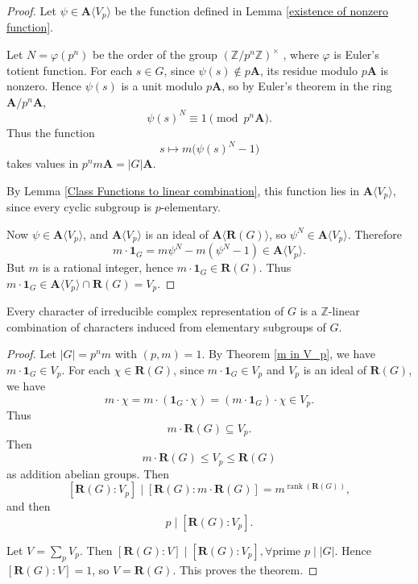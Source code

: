 \begin{proof}
Let \(\psi \in \mathbf{A}\langle V_p \rangle\) be the function defined in Lemma \ref{existence of nonzero function}.

Let \(N = \varphi(p^n)\) be the order of the group \((\mathbb{Z}/p^n\mathbb{Z})^\times\) , where $\varphi$ is Euler's totient function. For each \(s \in G\), since \(\psi(s) \notin p\mathbf{A}\), its residue modulo \(p\mathbf{A}\) is nonzero. Hence \(\psi(s)\) is a unit modulo \(p\mathbf{A}\), so by Euler's theorem in the ring \(\mathbf{A}/p^n\mathbf{A}\),
\[
\psi(s)^N \equiv 1 \pmod{p^n \mathbf{A}}.
\]
Thus the function
\[
s \mapsto m \big( \psi(s)^N - 1 \big)
\]
takes values in \(p^n m \mathbf{A} = |G| \mathbf{A}\).

By Lemma \ref{Class Functions to linear combination}, this function lies in \(\mathbf{A}\langle V_p \rangle\), since every cyclic subgroup is \(p\)-elementary.

Now \(\psi \in \mathbf{A}\langle V_p \rangle\), and \(\mathbf{A}\langle V_p \rangle\) is an ideal of \(\mathbf{A}\langle \mathbf{R}(G) \rangle\), so \(\psi^N \in \mathbf{A}\langle V_p \rangle\). Therefore
\[
m \cdot\mathbf1_G= m\psi^N - m(\psi^N - 1) \in \mathbf{A}\langle V_p \rangle.
\]
But \(m\) is a rational integer, hence \(m \cdot\mathbf1_G \in \mathbf{R}(G)\). Thus \(m  \cdot\mathbf1_G\in \mathbf{A}\langle V_p \rangle \cap \mathbf{R}(G)=V_p\).
\end{proof}
\begin{thm}\label{Brauer's Theorem}
Every character of irreducible complex representation of \(G\) is a \(\mathbb{Z}\)-linear combination of characters induced from elementary subgroups of \(G\).
\end{thm}
\begin{proof}
Let \(|G| = p^n m\) with \((p,m) = 1\). By Theorem \ref{m in V_p}, we have \(m  \cdot\mathbf1_G\in V_p\). For each \( \chi \in \mathbf{R}(G) \), since \( m \cdot \mathbf{1}_G \in V_p \) and \( V_p \) is an ideal of \( \mathbf{R}(G) \), we have
\[
 m \cdot \chi= m \cdot (\mathbf{1}_G \cdot \chi) = (m \cdot \mathbf{1}_G) \cdot \chi \in V_p.
\]
Thus
\[
m \cdot \mathbf{R}(G) \subseteq V_p.
\]
Then \[
m \cdot \mathbf{R}(G) \le V_p\le\mathbf{R}(G)
\]
as addition abelian groups. Then
\[[\mathbf{R}(G) : V_p]\mid[\mathbf{R}(G) : m\cdot \mathbf{R}(G)]=m^{\operatorname{rank}(\mathbf{R}(G))},\]and then \[p\mid[\mathbf{R}(G) : V_p].\] 

Let \(V = \sum_p V_p\). Then \([\mathbf{R}(G) : V]\mid[\mathbf{R}(G) : V_p],\forall \text{prime }p\mid|G|\). Hence \([\mathbf{R}(G) : V] = 1\), so \(V = \mathbf{R}(G)\). This proves the theorem.
\end{proof}

